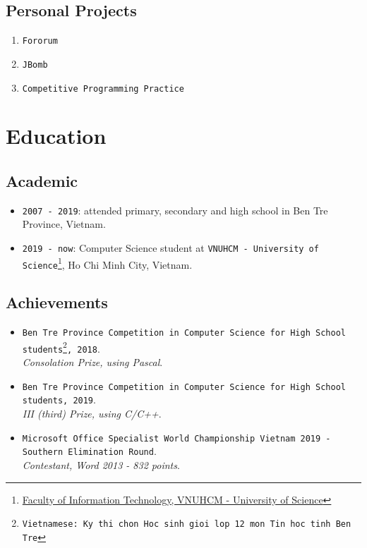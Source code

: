 \documentclass{article}
\begin{document}
       \subsection{Personal Projects}
           \begin{enumerate}
               \item \texttt{Fororum}\cite{fororum}
               \item \texttt{JBomb}\cite{jbomb}
               \item \texttt{Competitive Programming Practice}\cite{cpp}
           \end{enumerate}

    \section{Education}
        \subsection{Academic}
            \begin{itemize}
                \item {\texttt{2007 - 2019}}:
                attended primary, secondary and high school in Ben Tre Province, Vietnam.
                \item {\texttt{2019 - now}}: Computer Science student at \texttt{VNUHCM - University of Science}\footnote{\href{https://www.fit.hcmus.edu.vn}{Faculty of Information Technology, VNUHCM - University of Science}}, Ho Chi Minh City, Vietnam.
            \end{itemize}

        \subsection{Achievements}
            \begin{itemize}
                \item \texttt{Ben Tre Province Competition in Computer Science for High School students\footnote{Vietnamese: Ky thi chon Hoc sinh gioi lop 12 mon Tin hoc tinh Ben Tre}, 2018}.\\
                \textit{Consolation Prize, using Pascal}.

                \item \texttt{Ben Tre Province Competition in Computer Science for High School students, 2019}.\\
                \textit{III (third) Prize, using C/C++}.

                \item \texttt{Microsoft Office Specialist World Championship Vietnam 2019 - Southern Elimination Round}.\\
                \textit{Contestant, Word 2013 - 832 points}.
              \end{itemize}
\end{document}
